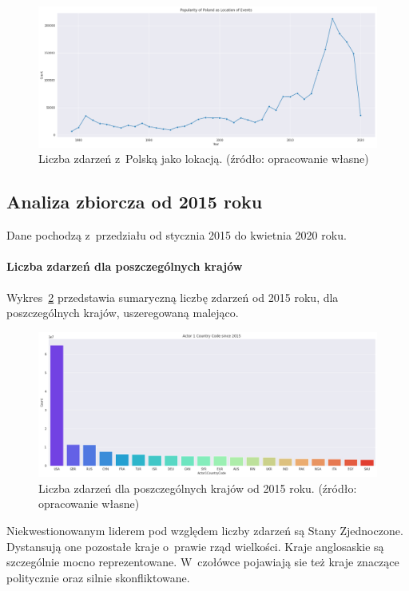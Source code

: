 \documentclass[11pt]{report}
\begin{document}
    \begin{figure}[!htp]
        \centering
        \includegraphics[width=\linewidth]{fig/PL/PLlocation.png}
        \caption{Liczba zdarzeń z~Polską jako lokacją. (źródło: opracowanie własne)}
        \label{fig:PLlocation}
    \end{figure}

    \subsection{Analiza zbiorcza od 2015 roku}
    Dane pochodzą z~przedziału od stycznia 2015 do kwietnia 2020 roku.

    \paragraph{Liczba zdarzeń dla poszczególnych krajów}
    Wykres~\ref{fig:GLOBALactor1} przedstawia sumaryczną liczbę zdarzeń od 2015 roku, dla poszczególnych krajów, uszeregowaną malejąco.
    \begin{figure}[!htp]
        \centering
        \includegraphics[width=\linewidth]{fig/GLOBAL/Actor1.png}
        \caption{Liczba zdarzeń dla poszczególnych krajów od 2015 roku. (źródło: opracowanie własne)}
        \label{fig:GLOBALactor1}
    \end{figure}
    Niekwestionowanym liderem pod względem liczby zdarzeń są Stany Zjednoczone. Dystansują one pozostałe kraje o~prawie rząd wielkości.
    Kraje anglosaskie są szczególnie mocno reprezentowane.
    W~czołówce pojawiają sie też kraje znaczące politycznie oraz silnie skonfliktowane.
\end{document}

